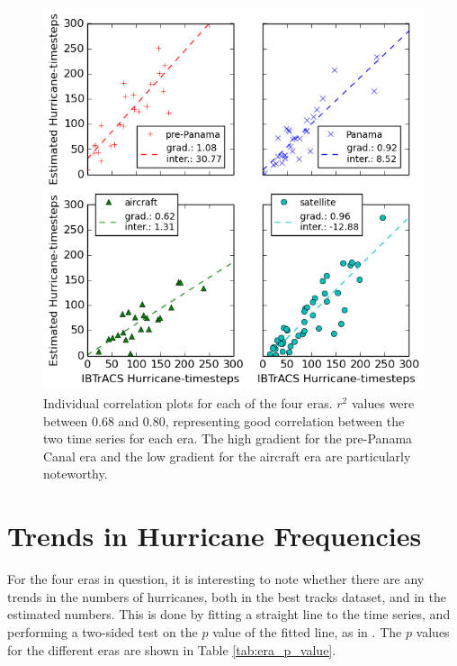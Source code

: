 \documentclass[pdftex,12pt,a4paper]{report}
\begin{document}
\begin{figure}[ht!]
    \centering
    \includegraphics[width=\textwidth]{figures/20th_century_corr_split}
    \caption{Individual correlation plots for each of the four eras. $r^2$ values were between 0.68
    and 0.80, representing good correlation between the two time series for each era. The high
    gradient for the pre-Panama Canal era and the low gradient for the aircraft era are particularly
    noteworthy. }
    \label{fig:20th_century_hurricane_corr_split}
\end{figure}

\newpage
\section{Trends in Hurricane Frequencies}
\label{sec:trends_freq}

For the four eras in question, it is interesting to note whether there are any trends in the numbers
of hurricanes, both in the best tracks dataset, and in the estimated numbers. This is done by
fitting a straight line to the time series, and performing a two-sided test on the $p$ value of the
fitted line, as in \textcite{vecchi2008estimates, emanuel2010tropical}. The $p$ values for the
different eras are shown in Table \ref{tab:era_p_value}.
\end{document}
